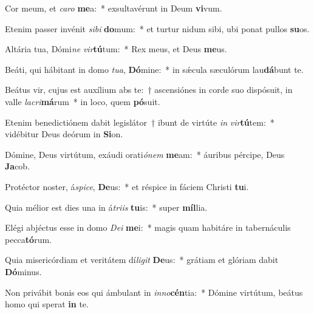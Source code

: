 \item Cor meum, et \textit{ca}\textit{ro} \textbf{me}a:~* exsultavérunt in Deum \textbf{vi}vum.
\item Etenim passer invénit \textit{si}\textit{bi} \textbf{do}mum:~* et turtur nidum sibi, ubi ponat pullos \textbf{su}os.
\item Altária tua, Dómi\textit{ne} \textit{vir}\textbf{tú}tum:~* Rex meus, et Deus \textbf{me}us.
\item Beáti, qui hábitant in domo \textit{tu}\textit{a}, \textbf{Dó}mine:~* in sǽcula sæculórum lau\textbf{dá}bunt te.
\item Beátus vir, cujus est auxílium abs te:~† ascensiónes in corde suo dispósuit, in valle \textit{la}\textit{cri}\textbf{má}rum~* in loco, quem \textbf{pó}suit.
\item Etenim benedictiónem dabit legislátor~† ibunt de virtúte \textit{in} \textit{vir}\textbf{tú}tem:~* vidébitur Deus deórum in \textbf{Si}on.
\item Dómine, Deus virtútum, exáudi orati\textit{ó}\textit{nem} \textbf{me}am:~* áuribus pércipe, Deus \textbf{Ja}cob.
\item Protéctor noster, á\textit{spi}\textit{ce}, \textbf{De}us:~* et réspice in fáciem Christi \textbf{tu}i.
\item Quia mélior est dies una in á\textit{tri}\textit{is} \textbf{tu}is:~* super \textbf{míl}lia.
\item Elégi abjéctus esse in domo \textit{De}\textit{i} \textbf{me}i:~* magis quam habitáre in tabernáculis pecca\textbf{tó}rum.
\item Quia misericórdiam et veritátem dí\textit{li}\textit{git} \textbf{De}us:~* grátiam et glóriam dabit \textbf{Dó}minus.
\item Non privábit bonis eos qui ámbulant in \textit{in}\textit{no}\textbf{cén}tia:~* Dómine virtútum, beátus homo qui sperat \textbf{in} te.
